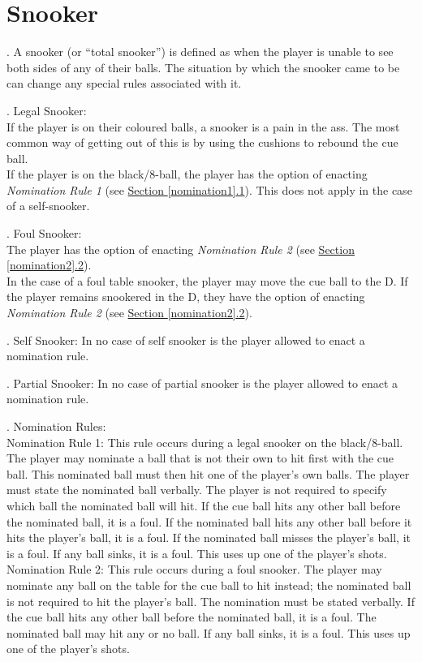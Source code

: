 \documentclass[a4paper, twocolumn]{article}
\newcommand{\fixedlabel}[1]{\textbf{\makebox[3.5em][l]{#1}}}
\newcommand{\itemspace}{\vspace{1.2mm}\\}
\begin{document}
\section{Snooker} \label{snooker}
\ex. A snooker (or “total snooker”) is defined as when the player is unable to see both sides of any of their balls. The situation by which the snooker came to be can change any special rules associated with it.\par
\ex. Legal Snooker:\itemspace
\fixedlabel{6.2.1}If the player is on their coloured balls, a snooker is a pain in the ass. The most common way of getting out of this is by using the cushions to rebound the cue ball.\itemspace
\fixedlabel{6.2.2}If the player is on the black/8-ball, the player has the option of enacting \emph{Nomination Rule 1} (see \hyperref[nomination1]{Section \ref*{nomination1}.1}). This does not apply in the case of a self-snooker.
\par
\ex. Foul Snooker:\itemspace
\fixedlabel{6.3.1}The player has the option of enacting \emph{Nomination Rule 2} (see \hyperref[nomination2]{Section \ref*{nomination2}.2}).\itemspace
\fixedlabel{6.3.2}In the case of a foul table snooker, the player may move the cue ball to the D. If the player remains snookered in the D, they have the option of enacting \emph{Nomination Rule 2} (see \hyperref[nomination2]{Section \ref*{nomination2}.2}).
\par
\ex. Self Snooker: In no case of self snooker is the player allowed to enact a nomination rule.\par
\ex. Partial Snooker: In no case of partial snooker is the player allowed to enact a nomination rule.\par
\ex. Nomination Rules:\itemspace
\fixedlabel{6.6.1}\label{nomination1}Nomination Rule 1: This rule occurs during a legal snooker on the black/8-ball. The player may nominate a ball that is not their own to hit first with the cue ball. This nominated ball must then hit one of the player's own balls. The player must state the nominated ball verbally. The player is not required to specify which ball the nominated ball will hit. If the cue ball hits any other ball before the nominated ball, it is a foul. If the nominated ball hits any other ball before it hits the player's ball, it is a foul. If the nominated ball misses the player's ball, it is a foul. If any ball sinks, it is a foul. This uses up one of the player's shots.\itemspace
\fixedlabel{6.6.2}\label{nomination2}Nomination Rule 2: This rule occurs during a foul snooker. The player may nominate any ball on the table for the cue ball to hit instead; the nominated ball is not required to hit the player's ball. The nomination must be stated verbally. If the cue ball hits any other ball before the nominated ball, it is a foul. The nominated ball may hit any or no ball. If any ball sinks, it is a foul. This uses up one of the player's shots.
\par
\end{document}
